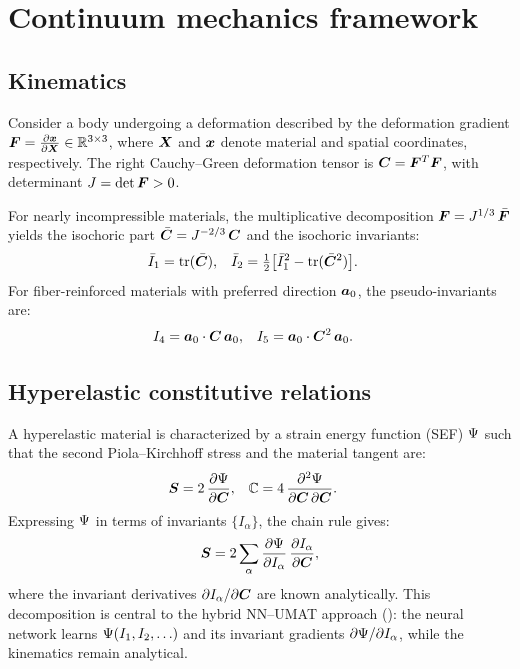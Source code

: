 \section{Continuum mechanics framework}
\label{sec:continuum}

\subsection{Kinematics}
\label{sec:continuum:kinematics}

Consider a body undergoing a deformation described by the deformation gradient
$\bm{F} = \frac{\partial \bm{x}}{\partial \bm{X}} \in \mathbb{R}^{3 \times 3}$, where $\bm{X}$ and
$\bm{x}$ denote material and spatial coordinates, respectively.  The right
Cauchy--Green deformation tensor is $\bm{C} = \bm{F}^T \bm{F}$, with determinant
$J = \det \bm{F} > 0$.

For nearly incompressible materials, the multiplicative decomposition
$\bm{F} = J^{1/3}\,\bar{\bm{F}}$ yields the isochoric part
$\bar{\bm{C}} = J^{-2/3}\,\bm{C}$ and the isochoric invariants:
\begin{align}
  \bar{I}_1 &= \operatorname{tr}(\bar{\bm{C}}), &
  \bar{I}_2 &= \tfrac{1}{2}\bigl[\bar{I}_1^2 - \operatorname{tr}(\bar{\bm{C}}^2)\bigr].
  \label{eq:isochoric_invariants}
\end{align}
For fiber-reinforced materials with preferred direction $\bm{a}_0$, the
pseudo-invariants are:
\begin{align}
  I_4 &= \bm{a}_0 \cdot \bm{C}\,\bm{a}_0, &
  I_5 &= \bm{a}_0 \cdot \bm{C}^2\,\bm{a}_0.
  \label{eq:fiber_invariants}
\end{align}

\subsection{Hyperelastic constitutive relations}
\label{sec:continuum:constitutive}

A hyperelastic material is characterized by a strain energy function (SEF)
$\Psi$ such that the second Piola--Kirchhoff stress and the material tangent
are:
\begin{align}
  \bm{S} &= 2\,\frac{\partial \Psi}{\partial \bm{C}}, &
  \mathbb{C} &= 4\,\frac{\partial^2 \Psi}{\partial \bm{C} \, \partial \bm{C}}.
  \label{eq:pk2_tangent}
\end{align}
Expressing $\Psi$ in terms of invariants $\{I_\alpha\}$, the chain rule gives:
\begin{equation}
  \bm{S} = 2 \sum_\alpha \frac{\partial \Psi}{\partial I_\alpha}\,\frac{\partial I_\alpha}{\partial \bm{C}},
  \label{eq:pk2_chain}
\end{equation}
where the invariant derivatives $\partial I_\alpha / \partial \bm{C}$ are known
analytically.  This decomposition is central to the hybrid NN--UMAT approach
(): the neural network learns
$\Psi(I_1, I_2, \ldots)$ and its invariant gradients $\partial \Psi / \partial
I_\alpha$, while the kinematics remain analytical.


